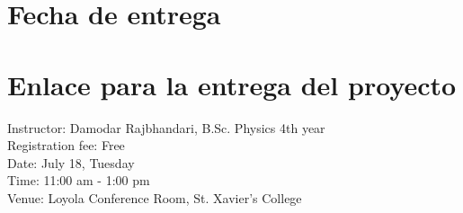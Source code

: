 \documentclass[a4paper,10pt]{article}
\begin{document}
\section{Fecha de entrega}



\section{Enlace para la entrega del proyecto}


Instructor: Damodar Rajbhandari, B.Sc. Physics 4th year\\
\hspace*{0.43cm} Registration fee: Free\\
\hspace*{0.43cm} Date: July 18, Tuesday\\
\hspace*{0.43cm}  Time: 11:00 am - 1:00 pm\\
\hspace*{0.43cm} Venue: Loyola Conference Room, St. Xavier's College\\




\vspace{2.8cm}
\end{document}
